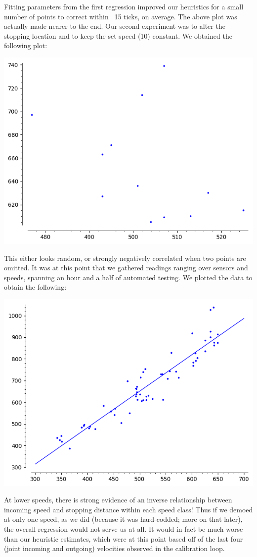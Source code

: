 \documentclass{amsart}
\begin{document}
Fitting parameters from the first regression improved our heuristics for a small number of points to correct within ~15 ticks, on average. The above plot was actually made nearer to the end. Our second experiment was to alter the stopping location and to keep the set speed (10) constant. We obtained the following plot:
\begin{center}
\includegraphics[scale=0.5]{x10s}
\end{center}
This either looks random, or strongly negatively correlated when two points are omitted. It was at this point that we gathered readings ranging over sensors and speeds, spanning an hour and a half of automated testing. We plotted the data to obtain the following:
\begin{center}
\includegraphics[scale=0.5]{regression}
\end{center}
At lower speeds, there is strong evidence of an inverse relationship between incoming speed and stopping distance within each speed class! Thus if we demoed at only one speed, as we did (because it was hard-codded; more on that later), the overall regression would not serve us at all. It would in fact be much worse than our heuristic estimates, which were at this point based off of the last four (joint incoming and outgoing) velocities observed in the calibration loop.
\end{document}
